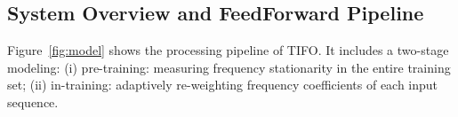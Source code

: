 \documentclass[sigconf,anonymous,review]{acmart}
\newcommand{\methodn}{\textsc{TIFO}}
\newcommand{\method}{\textsc{\methodn}\xspace}
\begin{document}
\subsection{System Overview and FeedForward Pipeline}
\label{subsec:method-overview}

Figure~\ref{fig:model} shows the processing pipeline of \method.
It includes a two-stage modeling: 
(i) pre-training: measuring frequency stationarity in the entire training set; 
(ii) in-training: adaptively re-weighting frequency coefficients of each input sequence.

\end{document}
